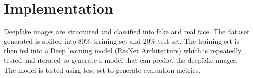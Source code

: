         \section{Implementation}
        Deepfake images are structured and classified into fake and real face. The dataset generated is splited into 80\% training set and 20\% test set. The training set is then fed into a Deep learning model (ResNet Architecture) which is repeatedly tested and iterated to generate a model that can predict the deepfake images. The model is tested using test set to generate evaluation metrics.
        \vspace{0.5in}
        \begin{figure}[hbt!]
        \end{figure}

